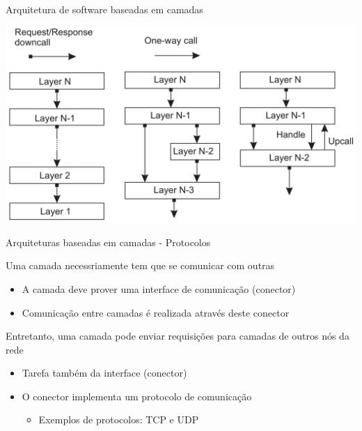 \documentclass[compress]{beamer}
\begin{document}
\begin{frame}{Arquitetura de software baseadas em camadas}

\centering \includegraphics[width=\textwidth]{images/camadas.png}

\end{frame}


\begin{frame}{Arquiteturas baseadas em camadas - Protocolos}

Uma camada necessriamente tem que se comunicar com outras
\begin{itemize}
    \item A camada deve prover uma interface de comunicação (conector)
    \item Comunicação entre camadas é realizada através deste conector
\end{itemize}

\vspace{0.5cm}

Entretanto, uma camada pode enviar requisições para camadas de outros nós da rede
\begin{itemize}
    \item Tarefa também da interface (conector)
    \item O conector implementa um protocolo de comunicação
    \begin{itemize}
        \item Exemplos de protocolos: TCP e UDP
    \end{itemize}
\end{itemize}
\end{frame}

\end{document}
